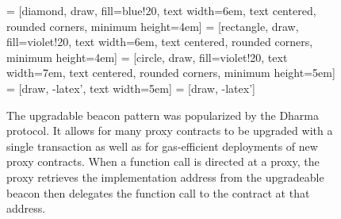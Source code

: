 \begin{figure}[ht] 
    \centering
     = [diamond, draw, fill=blue!20, 
    text width=6em, text centered, rounded corners, minimum height=4em] 
     = [rectangle, draw, fill=violet!20, 
    text width=6em, text centered, rounded corners, minimum height=4em]
     = [circle, draw, fill=violet!20, 
        text width=7em, text centered, rounded corners, minimum height=5em]
     = [draw, -latex', text width=5em]
     = [draw, -latex']
    
    \caption{The upgradable beacon pattern was popularized by the Dharma protocol. It allows for many proxy contracts to be upgraded with a single
    transaction as well as for gas-efficient deployments of new proxy contracts. When a function call is directed at a proxy, the proxy retrieves the
    implementation address from the upgradeable beacon then delegates the function call to the contract at that address.}
    \label{fig:UpgradePattern}
\end{figure}
